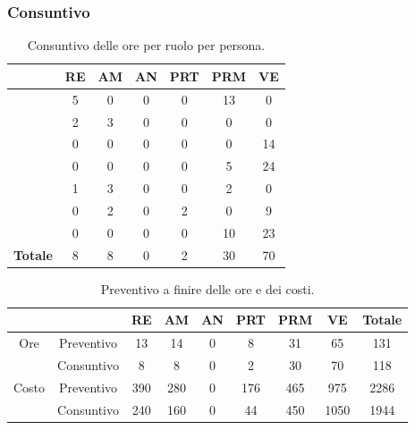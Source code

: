 {{{	\subsubsection{Consuntivo}
	\begin{table}[h!]
		\begin{center}
			\begin{tabular}{l c c c c c c}				
				\toprule
				&	RE& AM& AN& PRT& PRM& VE \\ 
				\midrule
				\BM	&	5	&	0	&	0	&	0	&	13	&	0\\ 
				\BA	&	2	&	3	&	0	&	0	&	0	&	0\\
				\CD	&	0	&	0	&	0	&	0	&	0	&	14\\ 
				\LS	&	0	&	0	&	0	&	0	&	5	&	24\\
				\PV &	1	&	3	&	0	&	0	&	2	&	0\\
				\ZF 	&	0	&	2	&	0	&	2	&	0	&	9\\
				\ZE &	0	&	0	&	0	&	0	&	10	&	23\\ \hline
				\textbf{Totale}&	 8 &	8 &	0	&	2 &		30 & 70\\
				\bottomrule
			\end{tabular}	
		\caption{Consuntivo delle ore per ruolo per persona.}
		\end{center}
	\end{table}
	
		\begin{table}[h!]
		\begin{center}
			\renewcommand{\arraystretch}{1.5}%
			\begin{tabular}{c| c c c c c c c |c }
				
				\toprule
				\multicolumn{2}{c}{}&	RE& AM& AN& PRT& PRM& VE& Totale \\ 
				\midrule
				\multirow{2}{*}{Ore}	& Preventivo & 13& 14& 0&  8& 31 & 65	& 131\\ 
							& Consuntivo & 8 	& 8 	& 0	& 2 & 30 & 70	& 118\\ \hline
				\multirow{2}{*}{Costo}	& Preventivo & 390	& 280	& 0 	& 176 	& 465 	& 975 & 2286\\ 
							& Consuntivo & 240	& 160 & 0 &  44 	& 450	& 1050	& 1944\\
				\bottomrule
			\end{tabular}
		\end{center}
		\caption{Preventivo a finire delle ore e dei costi.}
	\end{table}
	
}}}
